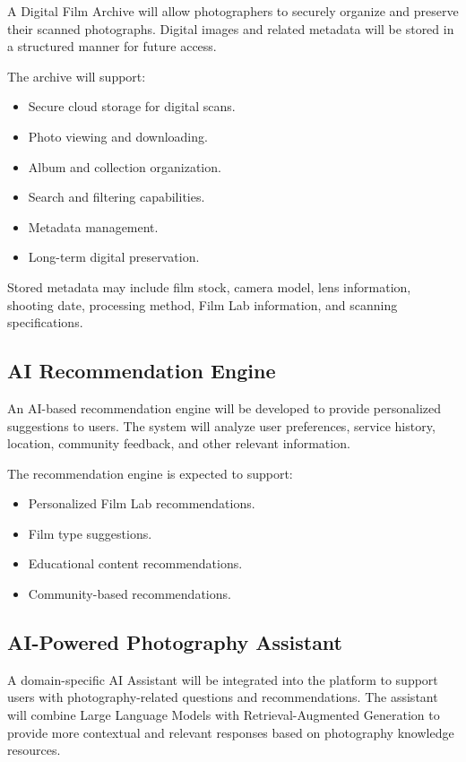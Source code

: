 A Digital Film Archive will allow photographers to securely organize and preserve their scanned photographs. Digital images and related metadata will be stored in a structured manner for future access.

The archive will support:

\begin{itemize}
    \item Secure cloud storage for digital scans.
    \item Photo viewing and downloading.
    \item Album and collection organization.
    \item Search and filtering capabilities.
    \item Metadata management.
    \item Long-term digital preservation.
\end{itemize}

Stored metadata may include film stock, camera model, lens information, shooting date, processing method, Film Lab information, and scanning specifications.

\subsection{AI Recommendation Engine}

An AI-based recommendation engine will be developed to provide personalized suggestions to users. The system will analyze user preferences, service history, location, community feedback, and other relevant information.

The recommendation engine is expected to support:

\begin{itemize}
    \item Personalized Film Lab recommendations.
    \item Film type suggestions.
    \item Educational content recommendations.
    \item Community-based recommendations.
\end{itemize}

\subsection{AI-Powered Photography Assistant}

A domain-specific AI Assistant will be integrated into the platform to support users with photography-related questions and recommendations. The assistant will combine Large Language Models with Retrieval-Augmented Generation to provide more contextual and relevant responses based on photography knowledge resources.

